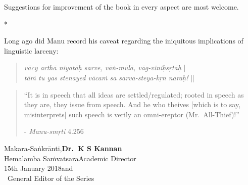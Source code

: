 Suggestions for improvement of the book in every aspect are most welcome.
\vskip 10pt

\centerline{*\quad*\quad*}
\vskip 5pt


Long ago did Manu record his caveat regarding the iniquitous implications of linguistic larceny:

\begin{quote}
{{\sl vācy arthā niyatāḥ sarve, vāṅ-mūlā, vāg-viniḥsṛtāḥ}} |\\
{\sl tāṁ tu yas stenayed vācaṁ sa sarva-steya-kṛn naraḥ!} ||
\end{quote}

\begin{quote}
“It is in speech that all ideas are settled/regulated; rooted in speech as they are, they issue from speech. And he who theives [which is to say, misinterprets] such speech is verily an omni-ereptor (Mr.\ All-Thief)!”

\hfill	- {\sl Manu-smṛti} 4.256
\end{quote}
\bigskip

\noindent
Makara-Saṅkrānti,\hfill	{\bf Dr.~K S Kannan}\\
Hemalamba Saṁvatsara\hfill Academic Director\\
15th January 2018\hfill and\\	
\phantom{.}~\hfill General Editor of the Series

